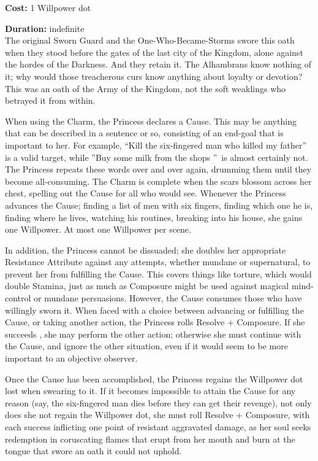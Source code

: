 \noindent \textbf{Cost:} 1 Willpower dot

\noindent \textbf{Duration:} indefinite \\

\noindent The original Sworn Guard and the One-Who-Became-Storms swore this oath when they stood before the gates of the last city of the Kingdom, alone against the hordes of the Darkness. And they retain it. The Alhambrans know nothing of it; why would those treacherous curs know anything about loyalty or devotion? This was an oath of the Army of the Kingdom, not the soft weaklings who betrayed it from within. 

When using the Charm, the Princess declares a Cause. This may be anything that can be described in a sentence or so, consisting of an end-goal that is important to her. For example, \textquotedblleft Kill the six-fingered man who killed my father\textquotedblright\, is a valid target, while \textquotedblright Buy some milk from the shops \textquotedblright\, is almost certainly not. The Princess repeats these words over and over again, drumming them until they become all-consuming. The Charm is complete when the scars blossom across her chest, spelling out the Cause for all who would see. Whenever the Princess advances the Cause; finding a list of men with six fingers, finding which one he is, finding where he lives, watching his routines, breaking into his house, she gains one Willpower. At most one Willpower per scene. 

In addition, the Princess cannot be dissuaded; she doubles her appropriate Resistance Attribute against any attempts, whether mundane or supernatural, to prevent her from fulfilling the Cause. This covers things like torture, which would double Stamina, just as much as Composure might be used against magical mind-control or mundane persuasions. However, the Cause consumes those who have willingly sworn it. When faced with a choice between advancing or fulfilling the Cause, or taking another action, the Princess rolls Resolve + Composure. If she succeeds , she may perform the other action; otherwise she must continue with the Cause, and ignore the other situation, even if it would seem to be more important to an objective observer. 

Once the Cause has been accomplished, the Princess regains the Willpower dot lost when swearing to it. If it becomes impossible to attain the Cause for any reason (say, the six-fingered man dies before they can get their revenge), not only does she not regain the Willpower dot, she must roll Resolve + Composure, with each success inflicting one point of resistant aggravated damage, as her soul seeks redemption in coruscating flames that erupt from her mouth and burn at the tongue that swore an oath it could not uphold. 

